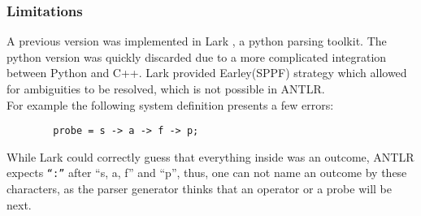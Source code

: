     \subsubsection{Limitations}
        A previous version was implemented in Lark \cite{lark}, a python parsing toolkit. The python version was quickly discarded due to a more complicated integration between Python and C++. Lark provided Earley(SPPF) strategy which allowed for ambiguities to be resolved, which is not possible in ANTLR. \\
        For example the following system definition presents a few errors:
        \begin{verbatim}
        probe = s -> a -> f -> p;
        \end{verbatim}
    While Lark could correctly guess that everything inside was an outcome, ANTLR expects \texttt{``:''} after ``s, a, f'' and ``p'', thus, one can not name an outcome by these characters, as the parser generator thinks that an operator or a probe will be next.
   

